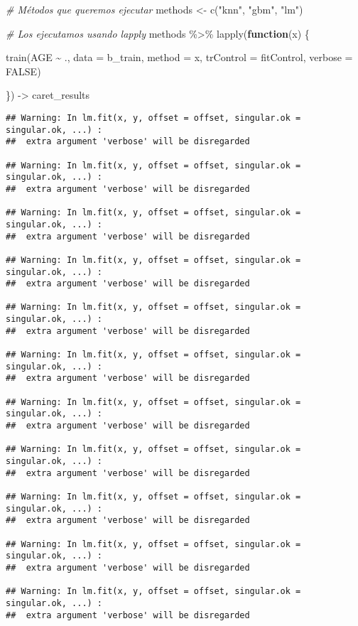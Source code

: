 \documentclass[
]{article}
\newenvironment{Shaded}{\begin{snugshade}}{\end{snugshade}}
\newcommand{\AttributeTok}[1]{\textcolor[rgb]{0.77,0.63,0.00}{#1}}
\newcommand{\CommentTok}[1]{\textcolor[rgb]{0.56,0.35,0.01}{\textit{#1}}}
\newcommand{\ConstantTok}[1]{\textcolor[rgb]{0.00,0.00,0.00}{#1}}
\newcommand{\ControlFlowTok}[1]{\textcolor[rgb]{0.13,0.29,0.53}{\textbf{#1}}}
\newcommand{\FunctionTok}[1]{\textcolor[rgb]{0.00,0.00,0.00}{#1}}
\newcommand{\NormalTok}[1]{#1}
\newcommand{\OtherTok}[1]{\textcolor[rgb]{0.56,0.35,0.01}{#1}}
\newcommand{\SpecialCharTok}[1]{\textcolor[rgb]{0.00,0.00,0.00}{#1}}
\newcommand{\StringTok}[1]{\textcolor[rgb]{0.31,0.60,0.02}{#1}}
\begin{document}
\begin{Shaded}
\begin{Highlighting}[]
\CommentTok{\# Métodos que queremos ejecutar}
\NormalTok{methods }\OtherTok{\textless{}{-}} \FunctionTok{c}\NormalTok{(}\StringTok{"knn"}\NormalTok{, }\StringTok{"gbm"}\NormalTok{, }\StringTok{"lm"}\NormalTok{)}

\CommentTok{\# Los ejecutamos usando lapply}
\NormalTok{methods }\SpecialCharTok{\%\textgreater{}\%} 
  \FunctionTok{lapply}\NormalTok{(}\ControlFlowTok{function}\NormalTok{(x) \{}
    
    \FunctionTok{train}\NormalTok{(AGE }\SpecialCharTok{\textasciitilde{}}\NormalTok{ ., }
          \AttributeTok{data =}\NormalTok{ b\_train,}
          \AttributeTok{method =}\NormalTok{ x,}
          \AttributeTok{trControl =}\NormalTok{ fitControl,}
          \AttributeTok{verbose =} \ConstantTok{FALSE}\NormalTok{)}
    
\NormalTok{  \}) }\OtherTok{{-}\textgreater{}}\NormalTok{ caret\_results}
\end{Highlighting}
\end{Shaded}

\begin{verbatim}
## Warning: In lm.fit(x, y, offset = offset, singular.ok = singular.ok, ...) :
##  extra argument 'verbose' will be disregarded

## Warning: In lm.fit(x, y, offset = offset, singular.ok = singular.ok, ...) :
##  extra argument 'verbose' will be disregarded

## Warning: In lm.fit(x, y, offset = offset, singular.ok = singular.ok, ...) :
##  extra argument 'verbose' will be disregarded

## Warning: In lm.fit(x, y, offset = offset, singular.ok = singular.ok, ...) :
##  extra argument 'verbose' will be disregarded

## Warning: In lm.fit(x, y, offset = offset, singular.ok = singular.ok, ...) :
##  extra argument 'verbose' will be disregarded

## Warning: In lm.fit(x, y, offset = offset, singular.ok = singular.ok, ...) :
##  extra argument 'verbose' will be disregarded

## Warning: In lm.fit(x, y, offset = offset, singular.ok = singular.ok, ...) :
##  extra argument 'verbose' will be disregarded

## Warning: In lm.fit(x, y, offset = offset, singular.ok = singular.ok, ...) :
##  extra argument 'verbose' will be disregarded

## Warning: In lm.fit(x, y, offset = offset, singular.ok = singular.ok, ...) :
##  extra argument 'verbose' will be disregarded

## Warning: In lm.fit(x, y, offset = offset, singular.ok = singular.ok, ...) :
##  extra argument 'verbose' will be disregarded

## Warning: In lm.fit(x, y, offset = offset, singular.ok = singular.ok, ...) :
##  extra argument 'verbose' will be disregarded
\end{verbatim}
\end{document}
